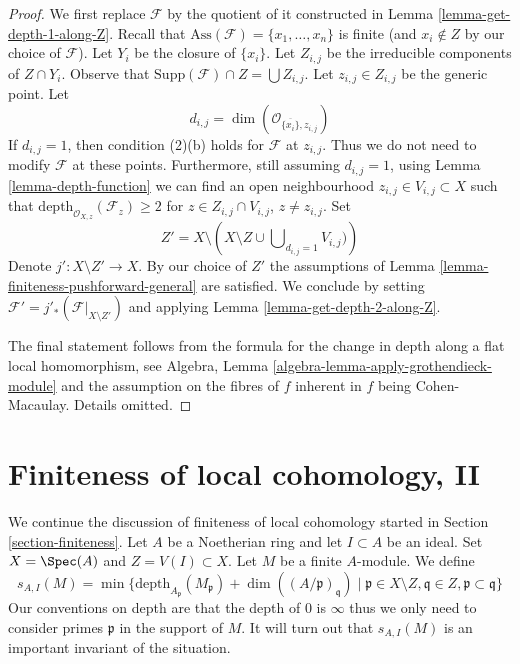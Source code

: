 \begin{proof}
We first replace $\mathcal{F}$ by the quotient of it constructed in
Lemma \ref{lemma-get-depth-1-along-Z}. Recall that
$\text{Ass}(\mathcal{F}) = \{x_1, \ldots, x_n\}$
is finite (and $x_i \not \in Z$ by our choice of $\mathcal{F}$).
Let $Y_i$ be the closure of $\{x_i\}$. Let
$Z_{i, j}$ be the irreducible components of $Z \cap Y_i$.
Observe that $\text{Supp}(\mathcal{F}) \cap Z = \bigcup Z_{i, j}$.
Let $z_{i, j} \in Z_{i, j}$ be the generic point.
Let
$$
d_{i, j} = \dim(\mathcal{O}_{\overline{\{x_i\}}, z_{i, j}})
$$
If $d_{i, j} = 1$, then condition (2)(b) holds for
$\mathcal{F}$ at $z_{i, j}$. Thus we do not need to modify
$\mathcal{F}$ at these points. Furthermore, still assuming
$d_{i, j} = 1$, using Lemma \ref{lemma-depth-function}
we can find an open neighbourhood
$z_{i, j} \in V_{i, j} \subset X$ such that
$\text{depth}_{\mathcal{O}_{X, z}}(\mathcal{F}_z) \geq 2$
for $z \in Z_{i, j} \cap V_{i, j}$, $z \not = z_{i, j}$.
Set
$$
Z' = X \setminus
\left(
X \setminus Z \cup \bigcup\nolimits_{d_{i, j} = 1} V_{i, j})
\right)
$$
Denote $j' : X \setminus Z' \to X$. By our choice of $Z'$
the assumptions of Lemma \ref{lemma-finiteness-pushforward-general}
are satisfied.
We conclude by setting $\mathcal{F}' = j'_*(\mathcal{F}|_{X \setminus Z'})$
and applying Lemma \ref{lemma-get-depth-2-along-Z}.

\medskip\noindent
The final statement follows from the formula for the change in
depth along a flat local homomorphism, see
Algebra, Lemma \ref{algebra-lemma-apply-grothendieck-module}
and the assumption on the fibres of $f$ inherent in $f$ being
Cohen-Macaulay. Details omitted.
\end{proof}






\section{Finiteness of local cohomology, II}
\label{section-finiteness-II}

\noindent
We continue the discussion of finiteness of local cohomology
started in Section \ref{section-finiteness}.
Let $A$ be a Noetherian ring and let $I \subset A$ be an ideal.
Set $X = \Spec(A)$ and $Z = V(I) \subset X$. Let $M$ be a finite $A$-module.
We define
\begin{equation}
\label{equation-cutoff}
s_{A, I}(M) =
\min \{
\text{depth}_{A_\mathfrak p}(M_\mathfrak p) + \dim((A/\mathfrak p)_\mathfrak q)
\mid
\mathfrak p \in X \setminus Z, \mathfrak q \in Z,
\mathfrak p \subset \mathfrak q
\}
\end{equation}
Our conventions on depth are that the depth of $0$ is $\infty$
thus we only need to consider primes $\mathfrak p$ in the support
of $M$. It will turn out that $s_{A, I}(M)$ is an important invariant of
the situation.


